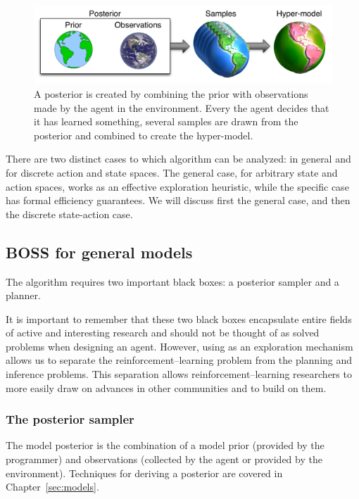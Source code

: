\begin{figure}[t]
\begin{center}
\includegraphics[width=0.9\linewidth]{figures/hypermodels}
\caption{A posterior is created by combining the prior with observations made by the agent in the environment. Every the agent decides that it has learned something, several samples are drawn from the posterior and combined to create the hyper-model.}
\label{sec:boss:hyper-model}
\end{center}
\end{figure}



There are two distinct cases to which  algorithm can be analyzed: in general and for discrete action and state spaces. The general case, for arbitrary state and action spaces, works as an effective exploration heuristic, while the specific case has formal efficiency guarantees. We will discuss first the general case, and then the discrete state-action case.

\subsection{BOSS for general models} 

The  algorithm requires two important black boxes: a posterior sampler and a planner. 

It is important to remember that these two black boxes encapsulate entire fields of active and interesting research and should not be thought of as solved problems when designing an agent. However, using  as an exploration mechanism allows us to separate the reinforcement--learning problem from the planning and inference problems. This separation allows reinforcement--learning researchers to more easily draw on advances in other communities and to build on them.

\subsubsection{The posterior sampler}

The model posterior is the combination of a model prior (provided by the programmer) and observations (collected by the agent or provided by the environment). Techniques for deriving a posterior are covered in Chapter~\ref{sec:models}.


